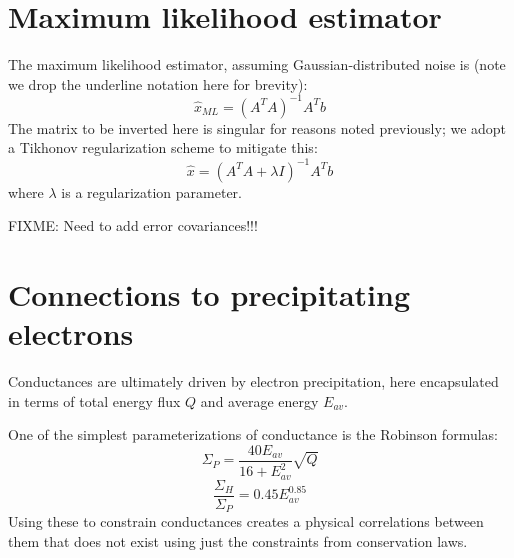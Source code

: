 \documentclass[11pt,letterpaper]{article}
\begin{document}
\section{Maximum likelihood estimator}

The maximum likelihood estimator, assuming Gaussian-distributed noise is (note we drop the underline notation here for brevity):
\begin{equation}
\hat{x}_{ML} = \left( A^T A  \right)^{-1} A^T b
\end{equation}
The matrix to be inverted here is singular for reasons noted previously; we adopt a Tikhonov regularization scheme to mitigate this:
\begin{equation}
\hat{x} = \left( A^T A  + \lambda I \right)^{-1} A^T b
\end{equation}
where $\lambda$ is a regularization parameter.  

FIXME: Need to add error covariances!!!


\section{Connections to precipitating electrons}

Conductances are ultimately driven by electron precipitation, here encapsulated in terms of total energy flux $Q$ and average energy $E_{av}$.  

One of the simplest parameterizations of conductance is the Robinson formulas:
\begin{equation}
\Sigma_P = \frac{40 E_{av}}{16+E_{av}^2} \sqrt{Q}
\end{equation}
\begin{equation}
\frac{\Sigma_H}{\Sigma_P} = 0.45 E_{av}^{0.85}
\end{equation}
Using these to constrain conductances creates a physical correlations between them that does not exist using just the constraints from conservation laws.  
\end{document}
